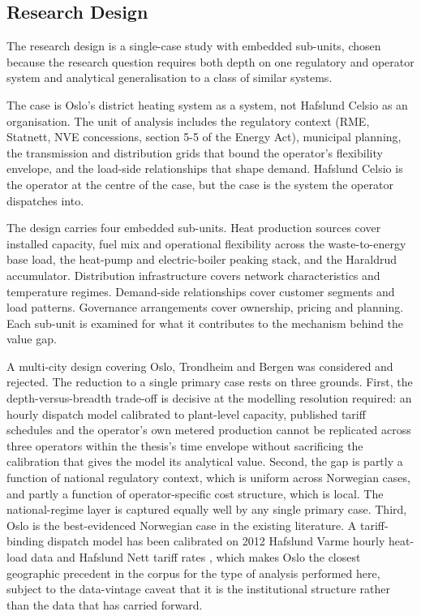 \subsection{Research Design}
\label{3-subsec:3.1 research design}

The research design is a single-case study with embedded sub-units, chosen because the research question requires both depth on one regulatory and operator system and analytical generalisation to a class of similar systems.

The case is Oslo's district heating system as a system, not Hafslund Celsio as an organisation. The unit of analysis includes the regulatory context (RME, Statnett, NVE concessions, section 5-5 of the Energy Act), municipal planning, the transmission and distribution grids that bound the operator's flexibility envelope, and the load-side relationships that shape demand. Hafslund Celsio is the operator at the centre of the case, but the case is the system the operator dispatches into.

The design carries four embedded sub-units. Heat production sources cover installed capacity, fuel mix and operational flexibility across the waste-to-energy base load, the heat-pump and electric-boiler peaking stack, and the Haraldrud accumulator. Distribution infrastructure covers network characteristics and temperature regimes. Demand-side relationships cover customer segments and load patterns. Governance arrangements cover ownership, pricing and planning. Each sub-unit is examined for what it contributes to the mechanism behind the value gap.

A multi-city design covering Oslo, Trondheim and Bergen was considered and rejected. The reduction to a single primary case rests on three grounds. First, the depth-versus-breadth trade-off is decisive at the modelling resolution required: an hourly dispatch model calibrated to plant-level capacity, published tariff schedules and the operator's own metered production cannot be replicated across three operators within the thesis's time envelope without sacrificing the calibration that gives the model its analytical value. Second, the gap is partly a function of national regulatory context, which is uniform across Norwegian cases, and partly a function of operator-specific cost structure, which is local. The national-regime layer is captured equally well by any single primary case. Third, Oslo is the best-evidenced Norwegian case in the existing literature. A tariff-binding dispatch model has been calibrated on 2012 Hafslund Varme hourly heat-load data and Hafslund Nett tariff rates \cite{kirkerud_impacts_2016}, which makes Oslo the closest geographic precedent in the corpus for the type of analysis performed here, subject to the data-vintage caveat that it is the institutional structure rather than the data that has carried forward.

